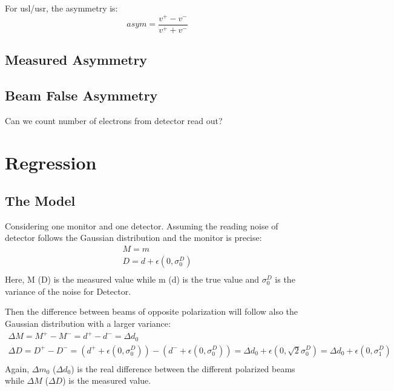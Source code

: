 For usl/usr, the asymmetry is:
$$ asym = \frac{v^+ - v^-}{v^+ + v^-} $$

\subsection{Measured Asymmetry}
\subsection{Beam False Asymmetry}

Can we count number of electrons from detector read out?

\section{Regression}

\subsection{The Model}
Considering one monitor and one detector. Assuming the reading noise of detector
follows the Gaussian distribution and the monitor is precise:
\begin{equation*}
    \begin{gathered}
	M = m	\\
	D = d + \epsilon(0, \sigma_0^D)    \\
    \end{gathered}
\end{equation*}
Here, M (D) is the measured value while m (d) is the true value and $\sigma_0^D$ 
is the variance of the noise for Detector.

Then the difference between beams of opposite polarization will follow also
the Gaussian distribution with a larger variance:
\begin{equation*}
    \begin{gathered}
	\Delta M = M^+ - M^- = d^+ - d^-    
	    = \Delta d_0    \\
	\Delta D = D^+ - D^- = (d^+ + \epsilon(0, \sigma_0^D)) - (d^- + \epsilon(0, \sigma_0^D))
	    = \Delta d_0 + \epsilon(0, \sqrt{2}\sigma_0^D)
	    = \Delta d_0 + \epsilon(0, \sigma_1^D) \\
    \end{gathered}
\end{equation*}
Again, $\Delta m_0$ ($\Delta d_0$) is the real difference between the
different polarized beams while $\Delta M$ ($\Delta D$) is the measured value.

